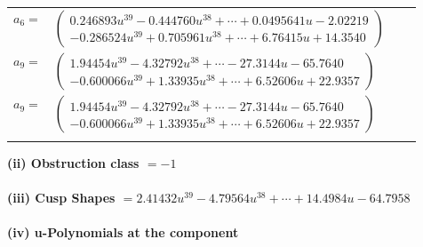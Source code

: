 \documentclass[1p]{elsarticle_modified}
\theoremstyle{definition}
\begin{document}
\begin{tabular}{m{7pt} m{180pt} m{7pt} m{180pt} }
\flushright $a_{6}=$&$\begin{pmatrix}0.246893 u^{39}-0.444760 u^{38}+\cdots+0.0495641 u-2.02219\\-0.286524 u^{39}+0.705961 u^{38}+\cdots+6.76415 u+14.3540\end{pmatrix}$ \\
\flushright $a_{9}=$&$\begin{pmatrix}1.94454 u^{39}-4.32792 u^{38}+\cdots-27.3144 u-65.7640\\-0.600066 u^{39}+1.33935 u^{38}+\cdots+6.52606 u+22.9357\end{pmatrix}$\\ \flushright $a_{9}=$&$\begin{pmatrix}1.94454 u^{39}-4.32792 u^{38}+\cdots-27.3144 u-65.7640\\-0.600066 u^{39}+1.33935 u^{38}+\cdots+6.52606 u+22.9357\end{pmatrix}$\\&\end{tabular}
\flushleft \textbf{(ii) Obstruction class $= -1$}\\~\\
\flushleft \textbf{(iii) Cusp Shapes $= 2.41432 u^{39}-4.79564 u^{38}+\cdots+14.4984 u-64.7958$}\\~\\
\newpage\renewcommand{\arraystretch}{1}
\flushleft \textbf{(iv) u-Polynomials at the component}\newline \\
\end{document}
